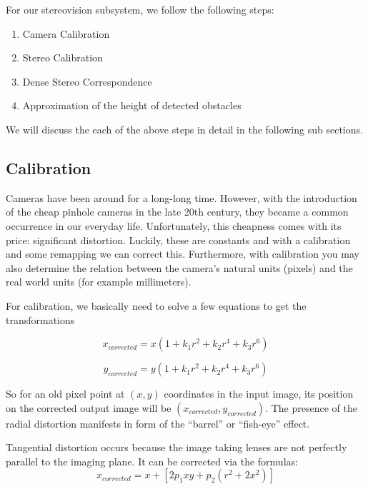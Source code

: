 \documentclass[11pt]{report}
\begin{document}
For our stereovision subsystem, we follow the following steps:

\begin{enumerate}
\item Camera Calibration
\item Stereo Calibration
\item Dense Stereo Correspondence
\item Approximation of the height of detected obstacles
\end{enumerate} 

We will discuss the each of the above steps in detail in the following sub sections.
\label{calib}
\subsection{Calibration}

Cameras have been around for a long-long time. However, with the introduction of the cheap pinhole cameras in the late 20th century, they became a common occurrence in our everyday life. Unfortunately, this cheapness comes with its price: significant distortion. Luckily, these are constants and with a calibration and some remapping we can correct this. Furthermore, with calibration you may also determine the relation between the camera’s natural units (pixels) and the real world units (for example millimeters). 

For calibration, we basically need to solve a few equations to get the transformations

\begin{equation}
x_{corrected} = x(1+k_{1}r^{2}+k_{2}r^{4}+k_{3}r^{6})
\end{equation}


\begin{equation}
y_{corrected} = y(1+k_{1}r^{2}+k_{2}r^{4}+k_{3}r^{6})
\end{equation}

So for an old pixel point at ${(x,y)}$ coordinates in the input image, its position on the corrected output image will be ${(x_{corrected}, y_{corrected})}$. The presence of the radial distortion manifests in form of the “barrel” or “fish-eye” effect.

Tangential distortion occurs because the image taking lenses are not perfectly parallel to the imaging plane. It can be corrected via the formulas:
\begin{equation}
x_{corrected} = x + [2p_{1}xy + p_{2}(r^{2} + 2x^{2})] 
\end{equation}
\end{document}
